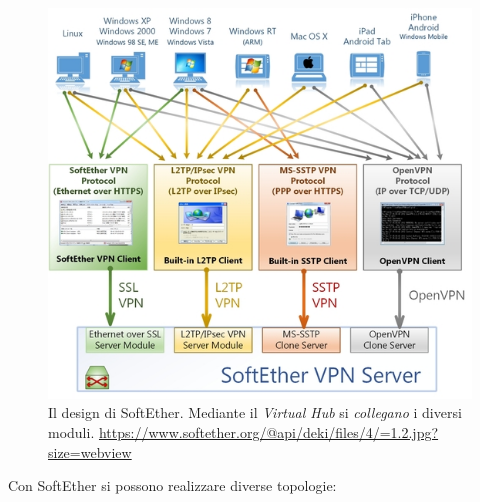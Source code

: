 \begin{figure}
  \includegraphics[scale=0.45]{img/softether_scheme}
  \caption[Il design di SoftEther]{Il design di SoftEther. Mediante il \textit{Virtual Hub} si \textit{collegano} i diversi
  moduli. \url{https://www.softether.org/@api/deki/files/4/=1.2.jpg?size=webview}}
  \label{fig:softether-archi}
\end{figure}
Con SoftEther si possono realizzare diverse topologie:
